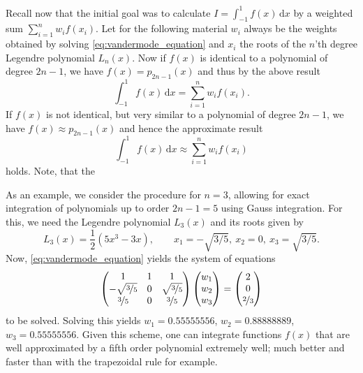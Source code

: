 \documentclass[a4paper,11pt]{article}
\numberwithin{equation}{section}
\begin{document}
{Recall now that the initial goal was to calculate $I=\int_{-1}^{1}f(x)\,\mathrm{d}x$ by a weighted sum $\sum_{i=1}^{n}w_if(x_i)$. Let for the following material $w_i$ always be the weights obtained by solving \cref{eq:vandermode_equation} and $x_i$ the roots of the $n$'th degree Legendre polynomial $L_n(x)$. Now if $f(x)$ is identical to a polynomial of degree $2n-1$, we have $f(x) = p_{2n-1}(x)$ and thus by the above result \begin{equation}
	\int_{-1}^{1}f(x)\,\mathrm{d}x = \sum_{i=1}^{n}w_i f(x_i).
\end{equation} If $f(x)$ is not identical, but very similar to a polynomial of degree $2n-1$, we have $f(x) \approx p_{2n-1}(x)$ and hence the approximate result \begin{equation}
\int_{-1}^{1}f(x)\,\mathrm{d}x \approx \sum_{i=1}^{n}w_if(x_i)
\end{equation} holds. Note, that the

As an example, we consider the procedure for $n=3$, allowing for exact integration of polynomials up to order $2n-1 = 5$ using Gauss integration. For this, we need the Legendre polynomial $L_3(x)$ and its roots given by \begin{equation}
	L_3(x) = \frac{1}{2}\left(5x^3 - 3x\right), \qquad  x_1=-\sqrt{3/5},\ x_2 = 0, \ x_3 = \sqrt{3/5}.
\end{equation} Now, \cref{eq:vandermode_equation} yields the system of equations \begin{equation}
\begin{pmatrix}
	1 & 1 & 1 \\
	-\sqrt{\nicefrac{3}{5}} & 0 & \sqrt{\nicefrac{3}{5}} \\
	\nicefrac{3}{5}  & 0 & \nicefrac{3}{5}
\end{pmatrix}\begin{pmatrix}
w_1 \\ w_2 \\ w_3
\end{pmatrix} = \begin{pmatrix}
2 \\ 0 \\ \nicefrac{2}{3}
\end{pmatrix}
\end{equation} to be solved. Solving this yields $w_1 = 0.55555556$, $w_2 = 0.88888889$, $w_3= 0.55555556$. Given this scheme, one can integrate functions $f(x)$ that are well approximated by a fifth order polynomial extremely well; much better and faster than with the trapezoidal rule for example.

}
\end{document}
